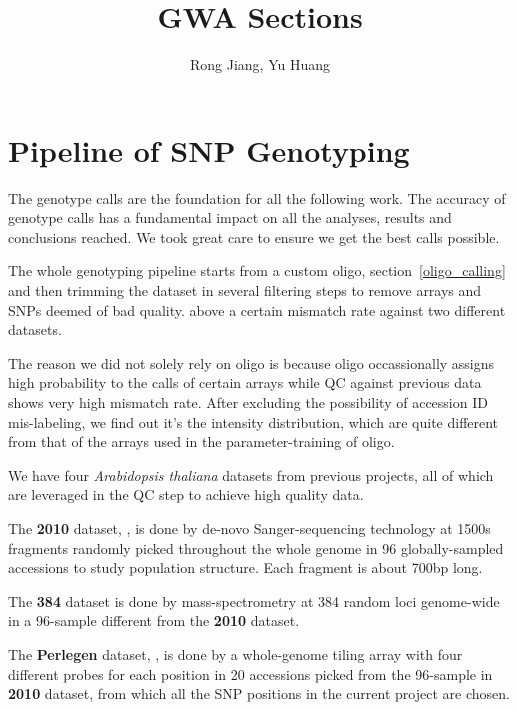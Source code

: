 \documentclass[a4paper,10pt]{article}
\title{GWA Sections}
\author{Rong Jiang, Yu Huang}
\begin{document}
\maketitle

\begin{abstract}

\end{abstract}

\tableofcontents

\section{Pipeline of SNP Genotyping}
The genotype calls are the foundation for all the following work. The accuracy of genotype calls
has a fundamental impact on all the analyses, results and conclusions reached. We took great care to ensure we get the best calls possible.

The whole genotyping pipeline starts from a custom oligo\cite{Carvalho2007}, section~\ref{oligo_calling} and then trimming the dataset in several filtering steps to remove arrays and SNPs deemed of bad quality. above a certain mismatch rate against two different  datasets.

The reason we did not solely rely on oligo is because oligo occassionally assigns high probability to the calls of certain arrays while QC against previous data shows very high mismatch rate. After excluding the possibility of accession ID mis-labeling, we find out it's the intensity distribution, which are quite different from that of the arrays used in the parameter-training of oligo.

We have four \textit{Arabidopsis thaliana} datasets from previous projects, all of which are  leveraged in the QC step to achieve high quality data.

The \textbf{2010} dataset, \cite{Nordborg2005}, is done by de-novo Sanger-sequencing technology at 1500s fragments randomly picked throughout the whole genome in 96 globally-sampled accessions to study population structure. Each fragment is about 700bp long.

The \textbf{384} dataset is done by mass-spectrometry at 384 random loci genome-wide in a 96-sample different from the \textbf{2010} dataset.

The \textbf{Perlegen} dataset, \cite{Clark2007a}, is done by a whole-genome tiling array with four different probes for each position in 20 accessions picked from the 96-sample in \textbf{2010} dataset, from which all the SNP positions in the current project are chosen.
\end{document}
